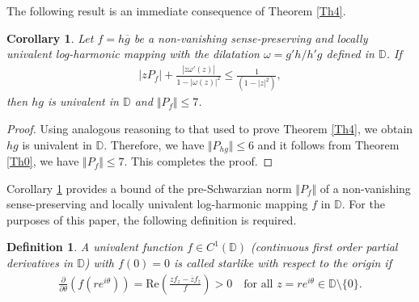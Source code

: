 \documentclass[12pt,reqno]{amsart}
\newtheorem{thm}{Theorem}[section]
\newtheorem{cor}{Corollary}[section]
\newtheorem{defi}{Definition}[section]
\newtheorem{open problem}{Open problem}[section]
\newcommand{\ol}{\overline}
\newcommand{\beas}{\begin{eqnarray*}}
\newcommand{\eeas}{\end{eqnarray*}}
\renewcommand{\epsilon}{\varepsilon}
\numberwithin{equation}{section}
\begin{document}
The following result is an immediate consequence of \textrm{Theorem} \ref{Th4}.
\begin{cor}\label{Th5}
Let $f=h\overline{g}$ be a non-vanishing sense-preserving and locally univalent log-harmonic mapping with the dilatation $\omega=g'h/h'g$ defined in $\mathbb{D}$. If 
\beas |z P_{f}|+\frac{|z \omega'(z)|}{1-|\omega(z)|^2}\leq \frac{1}{(1-|z|^2)},\eeas
then $hg$ is univalent in $\mathbb{D}$ and $\Vert P_f\Vert\leq 7$.
\end{cor}
\begin{proof}  Using analogous reasoning to that used to prove \textrm{Theorem} \ref{Th4}, we obtain $hg$ is univalent in $\mathbb{D}$.
Therefore, we have $\Vert P_{hg}\Vert \leq6$ and it follows from \textrm{Theorem \ref{Th0}}, we have $\Vert P_f\Vert \leq 7$. This completes the proof.
\end{proof}
Corollary \ref{Th5} provides a bound of the pre-Schwarzian norm $\Vert P_f\Vert$ of a non-vanishing sense-preserving and locally univalent log-harmonic mapping $f$ in $\mathbb{D}$.
For the purposes of this paper, the following definition is required.
\begin{defi} A univalent function $f\in C^1(\mathbb{D})$ (continuous first order partial derivatives in $\mathbb{D}$) with $f(0)=0$ is called starlike with respect to the origin if
\beas\frac{\partial }{\partial \theta}\left(f(r e^{i\theta })\right)=\text{Re}\left(\frac{z f_{z}-\ol{z} f_{\ol{z}}}{f}\right)>0\quad\text{for all $z=r e^{i\theta}\in\mathbb{D}\setminus\{0\}$.}\eeas
\end{defi}
\end{document}
